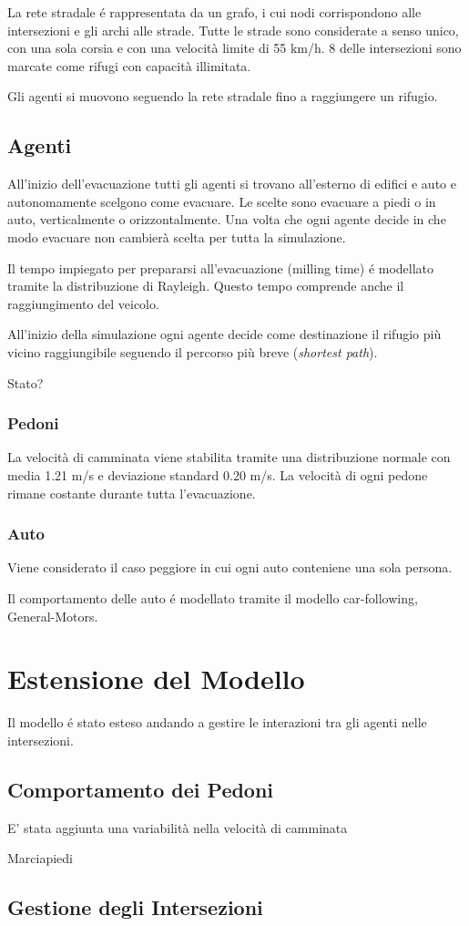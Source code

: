 La rete stradale é rappresentata da un grafo, i cui nodi corrispondono alle intersezioni e gli archi alle strade.
Tutte le strade sono considerate a senso unico, con una sola corsia e con una velocità limite di 55 km/h.
%
8 delle intersezioni sono marcate come rifugi con capacità illimitata.

Gli agenti si muovono seguendo la rete stradale fino a raggiungere un rifugio.

\subsection{Agenti}
All'inizio dell'evacuazione tutti gli agenti si trovano all'esterno di edifici e auto
e autonomamente scelgono come evacuare. Le scelte sono evacuare a piedi o in auto, verticalmente o orizzontalmente.
Una volta che ogni agente decide in che modo evacuare non cambierà scelta per tutta la simulazione.

Il tempo impiegato per prepararsi all'evacuazione (milling time) é modellato tramite la distribuzione di Rayleigh.
Questo tempo comprende anche il raggiungimento del veicolo.

All'inizio della simulazione ogni agente decide come destinazione il rifugio più vicino
raggiungibile seguendo il percorso più breve (\textit{shortest path}).

Stato?
\subsubsection{Pedoni}
La velocità di camminata viene stabilita tramite una distribuzione normale
con media 1.21 m/s e deviazione standard 0.20 m/s.
La velocità di ogni pedone rimane costante durante tutta l'evacuazione.


\subsubsection{Auto}
Viene considerato il caso peggiore in cui ogni auto conteniene una sola persona.

Il comportamento delle auto é modellato tramite il modello car-following, General-Motors.

\section{Estensione del Modello}
Il modello é stato esteso andando a gestire le interazioni tra gli agenti nelle intersezioni.

\subsection{Comportamento dei Pedoni}
E' stata aggiunta una variabilità nella velocità di camminata 

Marciapiedi


\subsection{Gestione degli Intersezioni}

